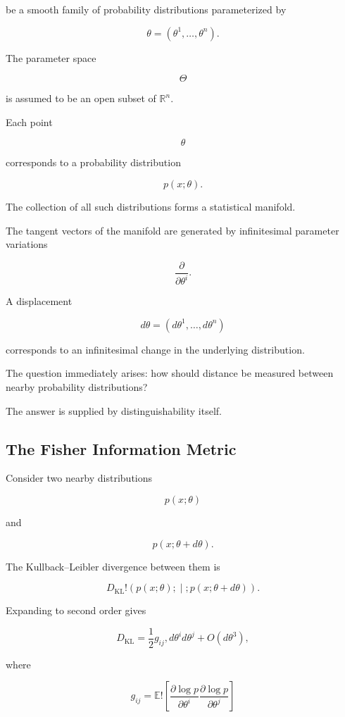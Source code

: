 \documentclass[12pt,twoside,openright]{book}
\begin{document}
be a smooth family of probability distributions
parameterized by

\[
\theta
=

(\theta^1,\ldots,\theta^n).
\]

The parameter space

\[
\Theta
\]

is assumed to be an open subset of
$\mathbb R^n$.

Each point

\[
\theta
\]

corresponds to a probability distribution

\[
p(x;\theta).
\]

The collection of all such distributions forms a
statistical manifold.

The tangent vectors of the manifold are generated by
infinitesimal parameter variations

\[
\frac{\partial}{\partial\theta^i}.
\]

A displacement

\[
d\theta
=

(d\theta^1,\ldots,d\theta^n)
\]

corresponds to an infinitesimal change in the underlying
distribution.

The question immediately arises: how should distance be
measured between nearby probability distributions?

The answer is supplied by distinguishability itself.

\subsection{The Fisher Information Metric}

Consider two nearby distributions

\[
p(x;\theta)
\]

and

\[
p(x;\theta+d\theta).
\]

The Kullback--Leibler divergence between them is

\[
D_{\mathrm{KL}}
!\left(
p(x;\theta)
;\middle|;
p(x;\theta+d\theta)
\right).
\]

Expanding to second order gives

\[
D_{\mathrm{KL}}
=

\frac12
g_{ij}
,d\theta^i d\theta^j
+
O(d\theta^3),
\]

where

\[
g_{ij}
=

\mathbb E
!\left[
\frac{\partial\log p}{\partial\theta^i}
\frac{\partial\log p}{\partial\theta^j}
\right]
\]
\end{document}
